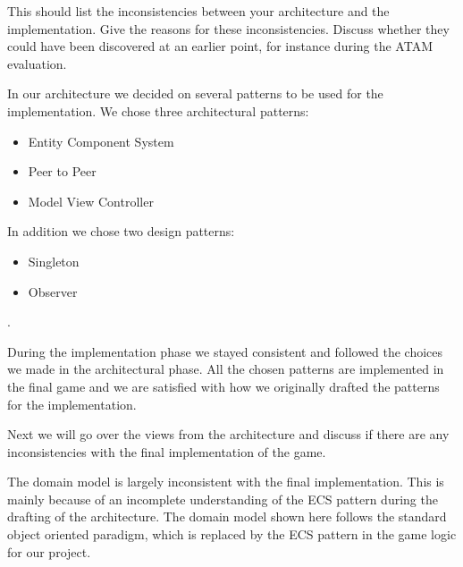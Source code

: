 
This should list the inconsistencies between your architecture and the implementation.
Give the reasons for these inconsistencies. Discuss whether they could have been discovered at an earlier point, for instance during the ATAM evaluation.\\


In our architecture we decided on several patterns to be used for the implementation. We chose three architectural patterns: 
\begin{itemize}
	\item Entity Component System
	\item Peer to Peer
	\item Model View Controller
\end{itemize}

In addition we chose two design patterns:

\begin{itemize}
	\item Singleton
	\item Observer
\end{itemize} .

During the implementation phase we stayed consistent and followed the choices we made in the architectural phase. All the chosen patterns are implemented in the final game and we are satisfied with how we originally drafted the patterns for the implementation.

Next we will go over the views from the architecture and discuss if there are any inconsistencies with the final implementation of the game.



The domain model is largely inconsistent with the final implementation. This is mainly because of an incomplete understanding of the ECS pattern during the drafting of the architecture. The domain model shown here follows the standard object oriented paradigm, which is replaced by the ECS pattern in the game logic for our project.


